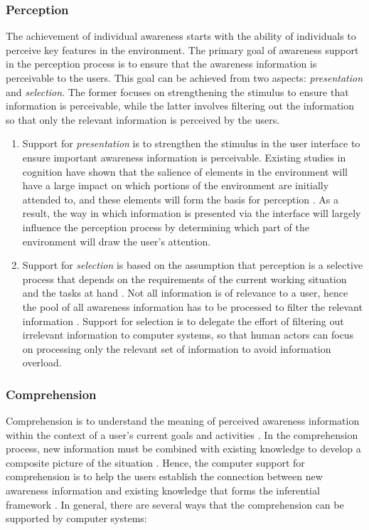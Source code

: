 \subsubsection*{Perception} %
\label{ssub:perception}
The achievement of individual awareness starts with the ability of individuals to perceive key features in the environment. The primary goal of awareness support in the perception process is to ensure that the awareness information is perceivable to the users. This goal can be achieved from two aspects: \emph{presentation} and \emph{selection}. The former focuses on strengthening the stimulus to ensure that information is perceivable, while the latter involves filtering out the information so that only the relevant information is perceived by the users.

\begin{enumerate}
	\item Support for \emph{presentation} is to strengthen the stimulus in the user interface to ensure important awareness information is perceivable. Existing studies in cognition have shown that the salience of elements in the environment will have a large impact on which portions of the environment are initially attended to, and these elements will form the basis for perception \cite{Hegarty2011}. As a result, the way in which information is presented via the interface will largely influence the perception process by determining which part of the environment will draw the user's attention.
	\item Support for \emph{selection} is based on the assumption that perception is a selective process that depends on the requirements of the current working situation and the tasks at hand \cite{Endsley1995}. Not all information is of relevance to a user, hence the pool of all awareness information has to be processed to filter the relevant information \cite{Berlage1999}. Support for selection is to delegate the effort of filtering out irrelevant information to computer systems, so that human actors can focus on processing only the relevant set of information to avoid information overload.
\end{enumerate}


\subsubsection*{Comprehension} %
\label{ssub:comprehension}
Comprehension is to understand the meaning of perceived awareness information within the context of a user's current goals and activities \cite{oulasvirta2007a}. In the comprehension process, new information must be combined with existing knowledge to develop a composite picture of the situation \cite{Endsley1995}. Hence, the computer support for comprehension is to help the users establish the connection between new awareness information and existing knowledge that forms the inferential framework \cite{carroll2003a}. In general, there are several ways that the comprehension can be supported by computer systems: 

